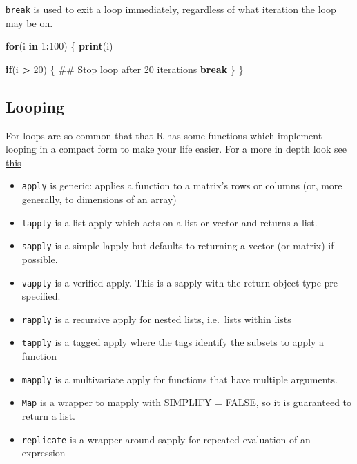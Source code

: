\documentclass[]{book}
\newenvironment{Shaded}{\begin{snugshade}}{\end{snugshade}}
\newcommand{\ControlFlowTok}[1]{\textcolor[rgb]{0.13,0.29,0.53}{\textbf{#1}}}
\newcommand{\DecValTok}[1]{\textcolor[rgb]{0.00,0.00,0.81}{#1}}
\newcommand{\KeywordTok}[1]{\textcolor[rgb]{0.13,0.29,0.53}{\textbf{#1}}}
\newcommand{\NormalTok}[1]{#1}
\newcommand{\OperatorTok}[1]{\textcolor[rgb]{0.81,0.36,0.00}{\textbf{#1}}}
\newcommand{\StringTok}[1]{\textcolor[rgb]{0.31,0.60,0.02}{#1}}
\providecommand{\tightlist}{%
  \setlength{\itemsep}{0pt}\setlength{\parskip}{0pt}}
\theoremstyle{definition}
\theoremstyle{definition}
\theoremstyle{definition}
\theoremstyle{remark}
\begin{document}
\texttt{break} is used to exit a loop immediately, regardless of what
iteration the loop may be on.

\begin{Shaded}
\begin{Highlighting}[]
\ControlFlowTok{for}\NormalTok{(i }\ControlFlowTok{in} \DecValTok{1}\OperatorTok{:}\DecValTok{100}\NormalTok{) \{}
      \KeywordTok{print}\NormalTok{(i)}

      \ControlFlowTok{if}\NormalTok{(i }\OperatorTok{>}\StringTok{ }\DecValTok{20}\NormalTok{) \{}
\NormalTok{              ## Stop loop after 20 iterations}
              \ControlFlowTok{break}  
\NormalTok{      \}     }
\NormalTok{\}}
\end{Highlighting}
\end{Shaded}

\hypertarget{looping}{%
\subsection{Looping}\label{looping}}

For loops are so common that that R has some functions which implement
looping in a compact form to make your life easier. For a more in depth
look see
\href{https://bookdown.org/rdpeng/rprogdatascience/loop-functions.html}{this}

\begin{itemize}
\tightlist
\item
  \texttt{apply} is generic: applies a function to a matrix's rows or
  columns (or, more generally, to dimensions of an array)
\item
  \texttt{lapply} is a list apply which acts on a list or vector and
  returns a list.
\item
  \texttt{sapply} is a simple lapply but defaults to returning a vector
  (or matrix) if possible.
\item
  \texttt{vapply} is a verified apply. This is a sapply with the return
  object type pre-specified.
\item
  \texttt{rapply} is a recursive apply for nested lists, i.e.~lists
  within lists
\item
  \texttt{tapply} is a tagged apply where the tags identify the subsets
  to apply a function
\item
  \texttt{mapply} is a multivariate apply for functions that have
  multiple arguments.
\item
  \texttt{Map} is a wrapper to mapply with SIMPLIFY = FALSE, so it is
  guaranteed to return a list.
\item
  \texttt{replicate} is a wrapper around sapply for repeated evaluation
  of an expression
\end{itemize}
\end{document}
